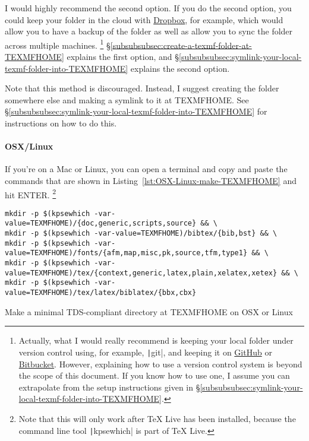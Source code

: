I would highly recommend the second option.
If you do the second option, you could keep your  folder in the cloud with \href{https://dropbox.com/}{Dropbox}, for example, which would allow you to have a backup of the folder as well as allow you to sync the folder across multiple machines.%
\footnote{%
Actually, what I would really recommend is keeping your local  folder under version control using, for example, \texttt|git|, and keeping it on \href{https://github.com/}{GitHub} or \href{https://bitbucket.org/}{Bitbucket}.
However, explaining how to use a version control system is beyond the scope of this document.
If you know how to use one, I assume you can extrapolate from the setup instructions given in \S\ref{subsubsubsec:symlink-your-local-texmf-folder-into-TEXMFHOME}.%
}
\S\ref{subsubsubsec:create-a-texmf-folder-at-TEXMFHOME} explains the first option, and \S\ref{subsubsubsec:symlink-your-local-texmf-folder-into-TEXMFHOME} explains the second option.

\label{subsubsubsec:create-a-texmf-folder-at-TEXMFHOME}

Note that this method is discouraged.
Instead, I suggest creating the folder somewhere else and making a symlink to it at TEXMFHOME.
See \S\ref{subsubsubsec:symlink-your-local-texmf-folder-into-TEXMFHOME} for instructions on how to do this.

\paragraph{OSX/Linux}

If you're on a Mac or Linux, you can open a terminal and copy and paste the commands that are shown in Listing~\ref{lst:OSX-Linux-make-TEXMFHOME} and hit ENTER.%
\footnote{%
Note that this will only work after TeX Live has been installed, because the command line tool \texttt|kpsewhich| is part of TeX Live.%
}

\begin{listing}[htbp]
	\centering
	\begin{verbatim}
mkdir -p $(kpsewhich -var-value=TEXMFHOME)/{doc,generic,scripts,source} && \
mkdir -p $(kpsewhich -var-value=TEXMFHOME)/bibtex/{bib,bst} && \
mkdir -p $(kpsewhich -var-value=TEXMFHOME)/fonts/{afm,map,misc,pk,source,tfm,type1} && \
mkdir -p $(kpsewhich -var-value=TEXMFHOME)/tex/{context,generic,latex,plain,xelatex,xetex} && \
mkdir -p $(kpsewhich -var-value=TEXMFHOME)/tex/latex/biblatex/{bbx,cbx}
	\end{verbatim}
	\caption{Make a minimal TDS-compliant directory at TEXMFHOME on OSX or Linux}
	\label{lst:OSX-Linux-make-TEXMFHOME}
\end{listing}

